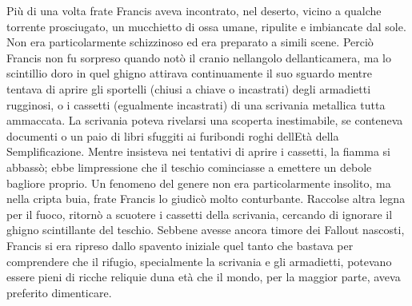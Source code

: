 Più di una volta frate Francis aveva incontrato, nel deserto, vicino a
qualche torrente prosciugato, un mucchietto di ossa umane, ripulite e
imbiancate dal sole. Non era particolarmente schizzinoso ed era
preparato a simili scene. Perciò Francis non fu sorpreso quando notò il
cranio nell\textquotesingle angolo dell\textquotesingle anticamera, ma
lo scintillio d\textquotesingle oro in quel ghigno attirava
continuamente il suo sguardo mentre tentava di aprire gli sportelli
(chiusi a chiave o incastrati) degli armadietti rugginosi, o i cassetti
(egualmente incastrati) di una scrivania metallica tutta ammaccata. La
scrivania poteva rivelarsi una scoperta inestimabile, se conteneva
documenti o un paio di libri sfuggiti ai furibondi roghi
dell\textquotesingle Età della Semplificazione. Mentre insisteva nei
tentativi di aprire i cassetti, la fiamma si abbassò; ebbe
l\textquotesingle impressione che il teschio cominciasse a emettere un
debole bagliore proprio. Un fenomeno del genere non era particolarmente
insolito, ma nella cripta buia, frate Francis lo giudicò molto
conturbante. Raccolse altra legna per il fuoco, ritornò a scuotere i
cassetti della scrivania, cercando di ignorare il ghigno scintillante
del teschio. Sebbene avesse ancora timore dei Fallout nascosti, Francis
si era ripreso dallo spavento iniziale quel tanto che bastava per
comprendere che il rifugio, specialmente la scrivania e gli armadietti,
potevano essere pieni di ricche reliquie d\textquotesingle una età che
il mondo, per la maggior parte, aveva preferito dimenticare.


